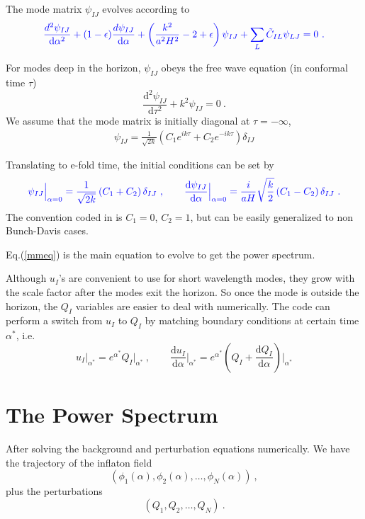 \documentclass[11pt]{article}
\newcommand{\ud}{\mathrm{d}}
\def\tilC{{\tilde C}}
\begin{document}
The mode matrix $\psi_{IJ}$ evolves according to 
\begin{equation}
{\color{blue}
\frac{d^2 \psi_{IJ}}{\ud \alpha^2} + (1-\epsilon) \frac{d \psi_{IJ}}{\ud \alpha} + \left(\frac{k^2}{a^2H^2} - 2 + \epsilon \right) \psi_{IJ} + \sum_L \tilC_{IL} \psi_{LJ} = 0 ~. \label{mmeq} }
\end{equation}

For modes deep in the horizon, $\psi_{IJ}$ obeys the free wave equation (in conformal time $\tau$)
\begin{equation}
\frac{\ud^2 \psi_{IJ}}{\ud \tau^2} + k^2 \psi_{IJ} = 0 ~. 
\end{equation}
We assume that the mode matrix is initially diagonal at $\tau = -\infty$, 
\begin{eqnarray}
\psi_{IJ} = \frac{1}{\sqrt{2k}}\left( C_1 e^{ik\tau} + C_2 e^{-ik\tau} \right) \delta_{IJ}
\end{eqnarray}

Translating to e-fold time, the initial conditions can be set by
\begin{equation}
{\color{blue}
 \psi_{IJ}\Big|_{\alpha=0} = \frac{1}{\sqrt{2k}}\, (C_1 + C_2)\, \delta_{IJ} ~, 
\quad\quad 
\frac{\ud \psi_{IJ}}{\ud \alpha}\Big|_{\alpha=0} = \frac{i}{aH}\sqrt{\frac{k}{2}}\,(C_1 - C_2)\,\delta_{IJ} ~. }
\end{equation}
The convention coded in is $C_1 = 0$, $C_2 = 1$, but can be easily generalized to non Bunch-Davis cases.

{\color{blue} Eq.(\ref{mmeq}) is the main equation to evolve to get the power spectrum. }

Although $u_I$'s are convenient to use for short wavelength modes, they grow with the scale factor after the modes exit the horizon. So once the mode is outside the horizon, the $Q_I$ variables are easier to deal with numerically. The code can perform a switch from $u_I$ to $Q_I$ by matching boundary conditions at certain time $\alpha^*$, i.e.
\begin{equation}
u_I\Big|_{\alpha^*} = e^{\alpha^*} Q_I \Big|_{\alpha^*} ~, \quad \quad 
\frac{\ud u_I}{\ud \alpha}\Big|_{\alpha^*} = e^{\alpha^*} \left(Q_I + \frac{\ud Q_I}{\ud \alpha}\right)\Big|_{\alpha^*}
\end{equation}


\section{The Power Spectrum}

After solving the background and perturbation equations numerically. We have the trajectory of the inflaton field 
\[
(\phi_1(\alpha), \phi_2(\alpha), \dots, \phi_N(\alpha) ) ~,
\]
plus the perturbations
\[
(Q_1, Q_2, \dots, Q_N) ~. 
\]
\end{document}
